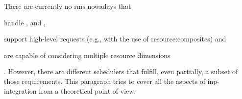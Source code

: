 There are currently no \glspl{rm} nowadays that
\begin{mylist}
    \item handle ,  and ,
    \item support high-level requests (e.g., with the use of \glspl{resource:composite}) and
    \item are capable of considering multiple resource dimensions
\end{mylist}.
However, there are different schedulers that fulfill, even partially, a subset of those requirements.
This paragraph tries to cover all the aspects of \gls{inp}-integration from a theoretical point of view.